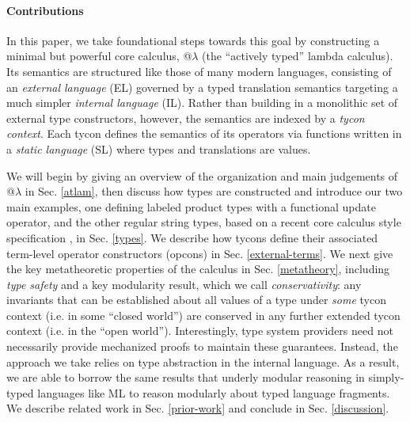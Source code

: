\documentclass[10pt,preprint]{sigplanconf}
\begin{document}
\paragraph{Contributions} In this paper, we take foundational steps towards this goal by  constructing a minimal but powerful core calculus, @$\lambda$ (the ``actively typed'' lambda calculus). %
Its semantics are structured like those of many modern languages, consisting of an \emph{external language} (EL) governed by a {typed translation semantics} targeting a much simpler \emph{internal language} (IL). 
Rather than building in a monolithic set of external type constructors, however, the  semantics are indexed by a \emph{tycon context}. Each tycon defines the semantics of its operators via functions written in a \emph{static language} (SL) where types and translations are values. %

We will begin by giving an overview of the organization  and main judgements of @$\lambda$ in Sec. \ref{atlam}, then discuss how types are constructed and introduce our two main examples, one defining labeled product types with a functional update operator, and the other regular string types, based on a recent core calculus style specification \cite{sanitation-psp14}, in Sec. \ref{types}. We describe how tycons define their associated term-level operator constructors (opcons) in Sec. \ref{external-terms}.  We next give the key metatheoretic properties of the calculus in Sec. \ref{metatheory}, including \emph{type safety} and a key modularity result, which we call  \emph{conservativity}: any invariants that can be established about all values of a type under \emph{some} tycon context (i.e. in some  ``closed world'') are conserved in any further extended tycon context (i.e. in the ``open world''). Interestingly, type system providers need not necessarily provide  mechanized proofs to maintain these guarantees. Instead, the approach we take relies on type abstraction in the internal language. As a result, we are able to borrow the same results that underly modular reasoning in simply-typed languages like ML to reason modularly about typed language fragments. We describe  related work in Sec. \ref{prior-work} and conclude in Sec. \ref{discussion}.
\end{document}
